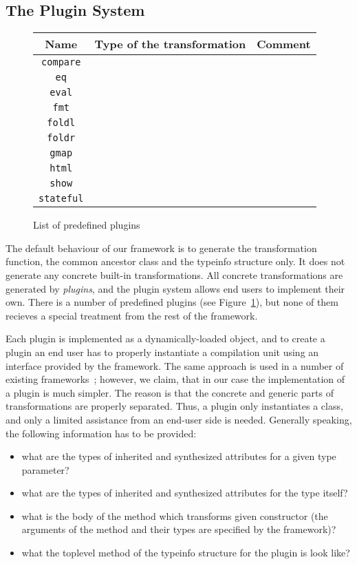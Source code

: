 \subsection{The Plugin System}
\label{plugins}

\begin{figure}[t]
  \center
  \begin{tabular}{ccl}
    Name & Type of the transformation & Comment \\
    \hline
    \lstinline|compare| & & \\
    \lstinline|eq| & & \\
    \lstinline|eval| & & \\
    \lstinline|fmt| & & \\
    \lstinline|foldl| & & \\
    \lstinline|foldr| & & \\
    \lstinline|gmap| & & \\
    \lstinline|html| & & \\
    \lstinline|show| & & \\
    \lstinline|stateful| & &         
  \end{tabular}
  \caption{List of predefined plugins}
  \label{listofplugins}
\end{figure}

The default behaviour of our framework is to generate the transformation function, the common ancestor class and the typeinfo structure only. It does not
generate any concrete built-in transformations. All concrete transformations are generated by \emph{plugins}, and the plugin system allows end users to
implement their own. There is a number of predefined plugins (see Figure~\ref{listofplugins}), but none of them recieves a special treatment from the
rest of the framework.

Each plugin is implemented as a dynamically-loaded object, and to create a plugin an end user has to properly instantiate a compilation unit using an interface
provided by the framework. The same approach is used in a number of existing frameworks~\cite{PPXLib,Yallop}; however, we claim, that in our case the
implementation of a plugin is much simpler. The reason is that the concrete and generic parts of transformations are properly separated. Thus,
a plugin only instantiates a class, and only a limited assistance from an end-user side is needed. Generally speaking, the following information has to be
provided:

\begin{itemize}
\item what are the types of inherited and synthesized attributes for a given type parameter?
\item what are the types of inherited and synthesized attributes for the type itself?
\item what is the body of the method which transforms given constructor (the arguments of the method and their types are specified by the framework)?
\item what the toplevel method of the typeinfo structure for the plugin is look like?
\end{itemize}


